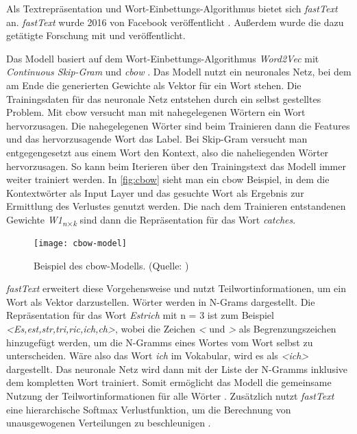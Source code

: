 Als Textrepräsentation und Wort-Einbettungs-Algorithmus bietet sich \textit{fastText} an. \textit{fastText} wurde 2016 von Facebook veröffentlicht \citep[vgl.][]{fastText_release2016}. Außerdem wurde die dazu getätigte Forschung mit \cite{bojanowski2017enriching} und \cite{joulin2016bag} veröffentlicht.

Das Modell basiert auf dem Wort-Einbettungs-Algorithmus \textit{Word2Vec} mit \textit{Continuous Skip-Gram} und \textit{\ac{cbow}} \citep[vgl.][]{bojanowski2017enriching}. Das Modell nutzt ein neuronales Netz, bei dem am Ende die generierten Gewichte als Vektor für ein Wort stehen. Die Trainingsdaten für das neuronale Netz entstehen durch ein selbst gestelltes Problem. Mit \ac{cbow} versucht man mit nahegelegenen Wörtern ein Wort hervorzusagen. Die nahegelegenen Wörter sind beim Trainieren dann die Features und das hervorzusagende Wort das Label. Bei Skip-Gram versucht man entgegengesetzt aus einem Wort den Kontext, also die naheliegenden Wörter hervorzusagen. So kann beim Iterieren über den Trainingstext das Modell immer weiter trainiert werden. In \autoref{fig:cbow} sieht man ein \ac{cbow} Beispiel, in dem die Kontextwörter als Input Layer und das gesuchte Wort als Ergebnis zur Ermittlung des Verlustes genutzt werden. Die nach dem Trainieren entstandenen Gewichte \textit{W1\textsubscript{n$\times $k}}\: sind dann die Repräsentation für das Wort \textit{catches}.
\begin{figure}[h]
	\centering
	\texttt{[image: cbow-model]}
	\caption[CBOW]{Beispiel des \ac{cbow}-Modells. (Quelle:  \cite{cbow_image})}
	\label{fig:cbow}
\end{figure}
\textit{fastText} erweitert diese Vorgehensweise und nutzt Teilwortinformationen, um ein Wort als Vektor darzustellen. Wörter werden in N-Grams dargestellt. \citep[vgl.][]{bojanowski2017enriching} Die Repräsentation für das Wort \textit{Estrich} mit n = 3 ist zum Beispiel \textit{<Es,est,str,tri,ric,ich,ch>}, wobei die Zeichen \textit{<} und \textit{>} als Begrenzungszeichen hinzugefügt werden, um die N-Gramms eines Wortes vom Wort selbst zu unterscheiden. Wäre also das Wort \textit{ich} im Vokabular, wird es als \textit{<ich>} dargestellt. Das neuronale Netz wird dann mit der Liste der N-Gramms inklusive dem kompletten Wort trainiert. Somit ermöglicht das Modell die gemeinsame Nutzung der Teilwortinformationen für alle Wörter \citep[vgl.][]{bojanowski2017enriching}. Zusätzlich nutzt \textit{fastText} eine hierarchische Softmax Verlustfunktion, um die Berechnung von unausgewogenen Verteilungen zu beschleunigen \citep[vgl.][]{fastText_release2016}.

